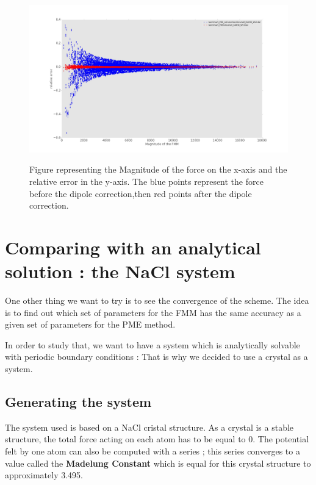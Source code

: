 \documentclass[10pt,twoside,a4paper]{report}
\begin{document}
\begin{figure}[H]
	   \includegraphics[scale=0.2]{magErr_Correction}
	    \label{fig:magnitude}
    \centering 
    \caption{Figure representing the Magnitude of the force on the x-axis and the relative error in the y-axis. The blue points represent the force before the dipole correction,then red points after the dipole correction.}    
    
    \label{fig:magnitude}
   \end{figure}  
   
\section{Comparing with an analytical solution : the NaCl system}

One other thing we want to try is to see the convergence of the scheme. The idea is to find out which set of parameters for the FMM has the same accuracy as a given set of parameters for the PME method. 

In order to study that, we want to have a system which is analytically solvable with periodic boundary conditions : That is why we decided to use a crystal as a system. 

\subsection{Generating the system}

The system used is based on a NaCl cristal structure. As a crystal is a stable structure, the total force acting on each atom has to be equal to 0. The potential felt by one atom can also be computed with a series ; this series converges to a value called the \textbf{Madelung Constant} which is equal for this crystal structure to approximately 3.495.
\end{document}
